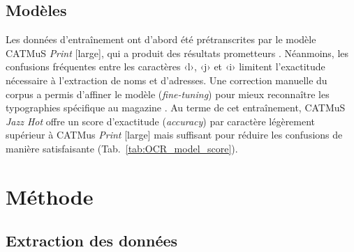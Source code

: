 \documentclass[fra, final]{anthology-ch}      %
\begin{document}
	\subsection{Modèles}
	Les données d’entraînement ont d'abord été prétranscrites par le modèle CATMuS \textit{Print} [large], qui a produit des résultats prometteurs \cite{gauffroy-naudin_fondue-jazzhot_2024}. Néanmoins, les confusions fréquentes entre les caractères ‹l›, ‹j› et ‹i› limitent l'exactitude nécessaire à l'extraction de noms et d'adresses. Une correction manuelle du corpus a permis d'affiner le modèle (\textit{fine-tuning}) pour mieux reconnaître les typographies spécifique au magazine \cite{gauffroy-naudin_catmus-jh_2026}. Au terme de cet entraînement, CATMuS \textit{Jazz Hot} offre un score d'exactitude (\textit{accuracy}) par caractère légèrement supérieur à CATMus \textit{Print} [large] mais suffisant pour réduire les confusions de manière satisfaisante (Tab.~\ref{tab:OCR_model_score}).
	
	
	\section{Méthode}
	\subsection{Extraction des données}
\end{document}

